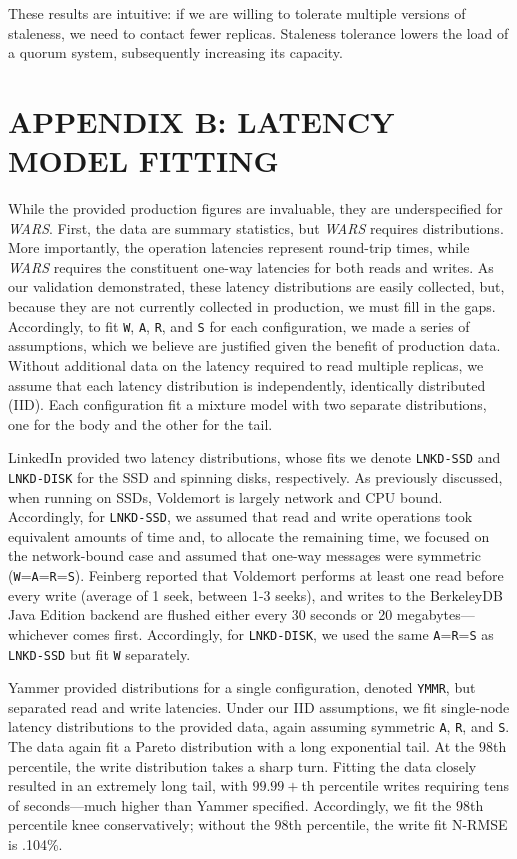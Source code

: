 \documentclass{vldb}
\begin{document}
These results are intuitive: if we are willing to tolerate multiple
versions of staleness, we need to contact fewer replicas.  Staleness
tolerance lowers the load of a quorum system, subsequently increasing
its capacity.


\section*{APPENDIX B: LATENCY MODEL FITTING}

While the provided production figures are invaluable, they are
underspecified for \textit{WARS}.  First, the data are summary
statistics, but \textit{WARS} requires distributions.  More
importantly, the operation latencies represent round-trip times, while
\textit{WARS} requires the constituent one-way latencies for both
reads and writes.  As our validation demonstrated, these latency
distributions are easily collected, but, because they are not
currently collected in production, we must fill in the
gaps. Accordingly, to fit \texttt{W}, \texttt{A}, \texttt{R}, and
\texttt{S} for each configuration, we made a series of assumptions,
which we believe are justified given the benefit of production data.
Without additional data on the latency required to read multiple
replicas, we assume that each latency distribution is independently,
identically distributed (IID).  Each configuration fit a mixture model
with two separate distributions, one for the body and the other for
the tail.

LinkedIn provided two latency distributions, whose fits we denote
\texttt{LNKD-SSD} and \texttt{LNKD-DISK} for the SSD and spinning
disks, respectively.  As previously discussed, when running on SSDs,
Voldemort is largely network and CPU bound.  Accordingly, for
\texttt{LNKD-SSD}, we assumed that read and write operations took
equivalent amounts of time and, to allocate the remaining time, we
focused on the network-bound case and assumed that one-way messages
were symmetric (\texttt{W}=\texttt{A}=\texttt{R}=\texttt{S}). Feinberg
reported that Voldemort performs at least one read before every write
(average of 1 seek, between 1-3 seeks), and writes to the BerkeleyDB
Java Edition backend are flushed either every 30 seconds or 20
megabytes---whichever comes first.  Accordingly, for
\texttt{LNKD-DISK}, we used the same \texttt{A}=\texttt{R}=\texttt{S}
as \texttt{LNKD-SSD} but fit \texttt{W} separately.

Yammer provided distributions for a single configuration, denoted
\texttt{YMMR}, but separated read and write latencies.  Under our IID
assumptions, we fit single-node latency distributions to the provided
data, again assuming symmetric \texttt{A}, \texttt{R}, and \texttt{S}.
The data again fit a Pareto distribution with a long exponential tail.
At the $98$th percentile, the write distribution takes a sharp turn.
Fitting the data closely resulted in an extremely long tail, with
$99.99+$th percentile writes requiring tens of seconds---much higher
than Yammer specified.  Accordingly, we fit the $98$th percentile knee
conservatively; without the $98$th percentile, the write fit N-RMSE is
.104\%.
\end{document}

